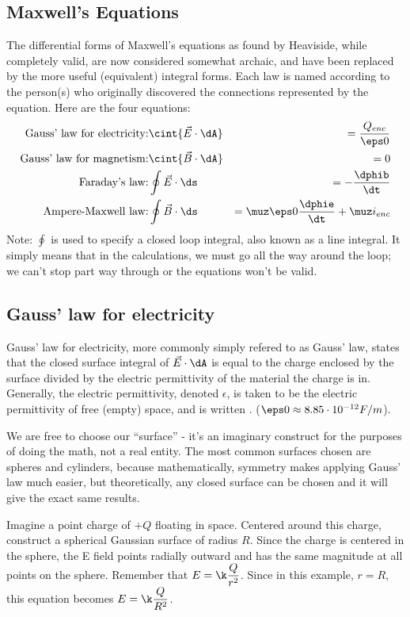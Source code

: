 \documentclass[12pt]{article}
\begin{document}
\subsection{Maxwell's Equations}

\indent The differential forms of Maxwell's equations as found by Heaviside, while completely valid, are now considered somewhat archaic, and have been replaced by the more useful (equivalent) integral forms. Each law is named according to the person(s) who originally discovered the connections represented by the equation. Here are the four equations:
\begin{eqnarray}
\text{Gauss' law for electricity:}& \displaystyle \cint{\vec{E}\cdot\dA}&=\frac{Q_{enc}}{\eps0}\\
\text{Gauss' law for magnetism:}& \displaystyle \cint{\vec{B}\cdot\dA}&=0\\
\text{Faraday's law:}& \displaystyle\oint{\vec{E}\cdot\ds}&=-\frac{\dphib}{\dt}\\
\text{Ampere-Maxwell law:}& \displaystyle\oint{\vec{B}\cdot\ds}&=\muz\eps0\frac{\dphie}{\dt}+\muz i_{enc}
\end{eqnarray}
Note: $\oint$ is used to specify a closed loop integral, also known as a line integral. It simply means that in the calculations, we must go all the way around the loop; we can't stop part way through or the equations won't be valid.

\subsection{Gauss' law for electricity}

\indent Gauss' law for electricity, more commonly simply refered to as Gauss' law, states that the closed surface integral of $\vec{E}\cdot\dA$ is equal to the charge enclosed by the surface divided by the electric permittivity of the material the charge is in. Generally, the electric permittivity, denoted $\epsilon$, is taken to be the electric permittivity of free (empty) space, and is written . ($\eps0\approx 8.85\cdot10^{-12} F/m$).

We are free to choose our ``surface'' - it's an imaginary construct for the purposes of doing the math, not a real entity. The most common surfaces chosen are spheres and cylinders, because mathematically, symmetry makes applying Gauss' law much easier, but theoretically, any closed surface can be chosen and it will give the exact same results.

Imagine a point charge of $+Q$ floating in space. Centered around this charge, construct a spherical Gaussian surface of radius $R$. Since the charge is centered in the sphere, the E field points radially outward and has the same magnitude at all points on the sphere. Remember that $\displaystyle E = \k \frac{Q}{r^2}$. Since in this example, $r=R$, this equation becomes $\displaystyle E = \k \frac{Q}{R^2}$. 
\end{document}
